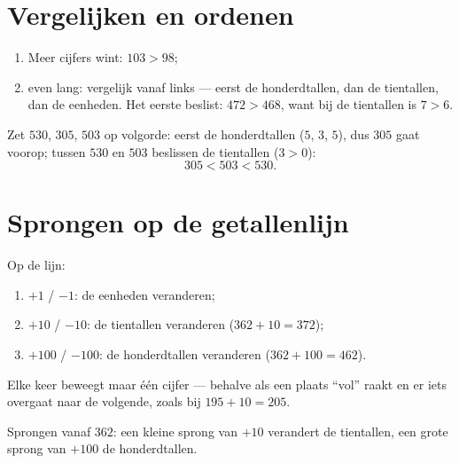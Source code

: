 \section{Vergelijken en ordenen}

\begin{method}\label{met:g2:numbers:compare}
\begin{enumerate}
  \item Meer cijfers wint: $103 > 98$;
  \item even lang: vergelijk vanaf links --- eerst de honderdtallen,
        dan de tientallen, dan de eenheden. Het eerste 
        beslist: $472 > 468$, want bij de tientallen is $7 > 6$.
\end{enumerate}
\end{method}

\begin{example}\label{ex:g2:numbers:order}
Zet $530$, $305$, $503$ op volgorde: eerst de honderdtallen ($5$, $3$,
$5$), dus $305$ gaat voorop; tussen $530$ en $503$ beslissen de
tientallen ($3 > 0$):
\[
305 < 503 < 530 .
\]
\end{example}

\section{Sprongen op de getallenlijn}

\begin{method}\label{met:g2:numbers:jumps}
Op de lijn:
\begin{enumerate}
  \item $+1$ / $-1$: de eenheden veranderen;
  \item $+10$ / $-10$: de tientallen veranderen ($362 + 10 = 372$);
  \item $+100$ / $-100$: de honderdtallen veranderen
        ($362 + 100 = 462$).
\end{enumerate}
Elke keer beweegt maar één cijfer --- behalve als een plaats ``vol''
raakt en er iets overgaat naar de volgende, zoals bij
$195 + 10 = 205$.
\end{method}

\begin{omfigure}

{\small Sprongen vanaf $362$: een kleine sprong van $+10$ verandert de
tientallen, een grote sprong van $+100$ de honderdtallen.}
\end{omfigure}

